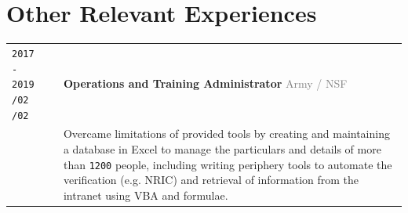 \documentclass[11pt]{article}
\newcommand{\monoSp}[1]{{\usefont{T1}{rbtm}{m}{n} #1}}
\newcommand{\urllinkout}[2]{\href{#1}{\textcolor{text_link}{\small \texttt{#2}}}}
\newcommand{\code}[1]{\monoSp{#1}}
\newcommand{\nummer}[1]{\texttt{\large #1}}
\begin{document}
\section{\textcolor{section_3}{Other Relevant Experiences}}
\vspace{-\baselineskip}
{
	\renewcommand{\arraystretch}{2}
	\renewcommand{\cellalign}{lt}
	\begin{tabularx}{\textwidth}{@{}l p{0.20cm} X @{}}
		\makecell{\texttt{\large 2017 - 2019} \vspace{-1mm} \\ \texttt{\footnotesize /02} \hspace{1.5em} \texttt{\footnotesize /02}} & & \textbf{Operations and Training Administrator} \hfill \textcolor{gray}{Army / NSF} \\[-1em]
		& & {\small Overcame limitations of provided tools by creating and maintaining a database in Excel to manage the particulars and details of more than \nummer{1200} people, including writing periphery tools to automate the verification {\footnotesize(e.g. NRIC)} and retrieval of information from the intranet using \code{VBA} and formulae. }\\

\end{tabularx}}
\end{document}
